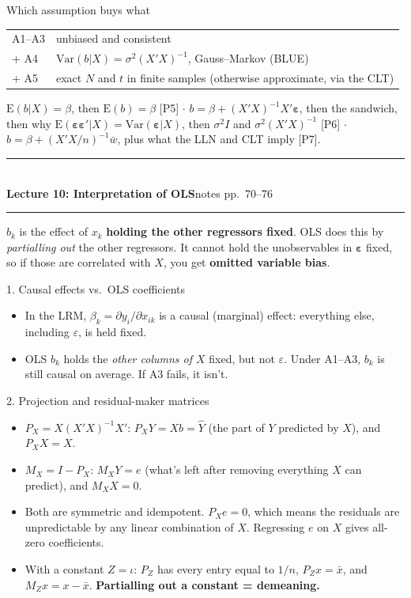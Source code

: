 \documentclass[10pt]{article}
\newcommand{\E}{\mathrm{E}}
\newcommand{\Var}{\mathrm{Var}}
\newcommand{\veps}{\bm{\varepsilon}}
\newcommand{\lec}[3]{%
  {\color{ink}\rule{\linewidth}{1.2pt}}\\[-2pt]
  {\Large\bfseries\color{ink} Lecture #1: #2}\hfill{\small\color{gray}#3}\\[-6pt]
  {\color{ink}\rule{\linewidth}{0.4pt}}\par\vspace{2pt}}
\begin{document}
\begin{topic}{Which assumption buys what}
\renewcommand{\arraystretch}{1.1}
\begin{tabular}{@{}ll@{}}
A1--A3 & unbiased and consistent\\
+ A4 & $\Var(b|X)=\sigma^2(X'X)^{-1}$, Gauss--Markov (BLUE)\\
+ A5 & exact $N$ and $t$ in finite samples (otherwise approximate, via the CLT)
\end{tabular}
\end{topic}

\begin{exam}
$\E(b|X)=\beta$, then $\E(b)=\beta$ [P5] $\cdot$ $b=\beta+(X'X)^{-1}X'\veps$, then the sandwich, then why $\E(\veps\veps'|X)=\Var(\veps|X)$, then $\sigma^2I$ and $\sigma^2(X'X)^{-1}$ [P6] $\cdot$ $b=\beta+(X'X/n)^{-1}\bar w$, plus what the LLN and CLT imply [P7].
\end{exam}

\newpage
\lec{10}{Interpretation of OLS}{notes pp.\ 70--76}

\begin{bigidea}
$b_k$ is the effect of $x_k$ \textbf{holding the other regressors fixed}. OLS does this by \emph{partialling out} the other regressors. It cannot hold the unobservables in $\veps$ fixed, so if those are correlated with $X$, you get \textbf{omitted variable bias}.
\end{bigidea}

\begin{topic}{1. Causal effects vs.\ OLS coefficients}
\begin{itemize}
\item In the LRM, $\beta_k=\partial y_i/\partial x_{ik}$ is a causal (marginal) effect: everything else, including $\varepsilon$, is held fixed.
\item OLS $b_k$ holds the \emph{other columns of $X$} fixed, but not $\varepsilon$. Under A1--A3, $b_k$ is still causal on average. If A3 fails, it isn't.
\end{itemize}
\end{topic}

\begin{topic}{2. Projection and residual-maker matrices}
\begin{itemize}
\item $P_X=X(X'X)^{-1}X'$: $P_XY=Xb=\hat Y$ (the part of $Y$ predicted by $X$), and $P_XX=X$.
\item $M_X=I-P_X$: $M_XY=e$ (what's left after removing everything $X$ can predict), and $M_XX=0$.
\item Both are symmetric and idempotent. $P_Xe=0$, which means the residuals are unpredictable by any linear combination of $X$. Regressing $e$ on $X$ gives all-zero coefficients.
\item With a constant $Z=\iota$: $P_Z$ has every entry equal to $1/n$, $P_Zx=\bar x$, and $M_Zx=x-\bar x$. \textbf{Partialling out a constant = demeaning.}
\end{itemize}
\end{topic}
\end{document}
